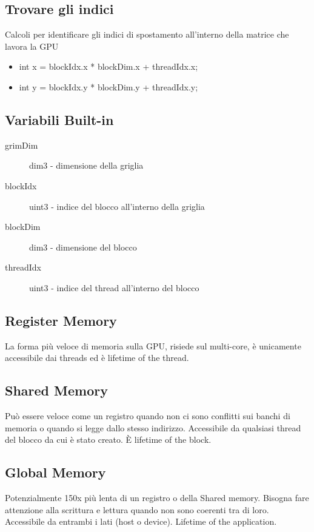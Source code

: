 \documentclass[8pt,a4paper]{article}
\begin{document}
\begin{multicols}{5}
    \subsection{Trovare gli indici}
    Calcoli per identificare gli indici di spostamento all'interno della matrice che lavora la GPU    
    
    \begin{itemize}
        \item int x = blockIdx.x * blockDim.x + threadIdx.x;
        \item int y = blockIdx.y * blockDim.y + threadIdx.y; 
    \end{itemize}
       
    
    \subsection{Variabili Built-in}
    \begin{description}
        \item[grimDim] dim3 - dimensione della griglia
        \item[blockIdx] uint3 - indice del blocco all’interno della griglia
        \item[blockDim] dim3 - dimensione del blocco
        \item[threadIdx] uint3 - indice del thread all’interno del blocco
    \end{description}
    
    \subsection{Register Memory}
    La forma più veloce di memoria sulla GPU, risiede sul multi-core, è unicamente accessibile 
    dai threads ed è lifetime of the thread.
    
    \subsection{Shared Memory}
    Può essere veloce come un registro quando non ci sono conflitti sui banchi di memoria o 
    quando si legge dallo stesso indirizzo. Accessibile da qualsiasi thread del blocco 
    da cui è stato creato. È lifetime of the block.
    
    \subsection{Global Memory}
    Potenzialmente 150x più lenta di un registro o della Shared memory. Bisogna fare attenzione 
    alla scrittura e lettura quando non sono coerenti tra di loro. Accessibile da entrambi i 
    lati (host o device). Lifetime of the application.
    

\end{multicols}
\end{document}

